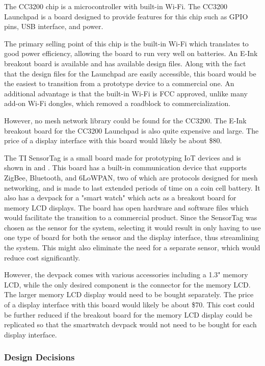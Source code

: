\documentclass[PPFS.tex]{template/subfiles}
\begin{document}
The CC3200 chip is a microcontroller with built-in Wi-Fi. The CC3200 Launchpad is a board designed to provide features for this chip such as GPIO pins, USB interface, and power.

The primary selling point of this chip is the built-in Wi-Fi which translates to good power efficiency, allowing the board to run very well on batteries. An E-Ink breakout board is available and has available design files. Along with the fact that the design files for the Launchpad are easily accessible, this board would be the easiest to transition from a prototype device to a commercial one. An additional advantage is that the built-in Wi-Fi is FCC approved, unlike many add-on Wi-Fi dongles, which removed a roadblock to commercialization.

However, no mesh network library could be found for the CC3200. The E-Ink breakout board for the CC3200 Launchpad is also quite expensive and large. The price of a display interface with this board would likely be about \$80.

The TI SensorTag is a small board made for prototyping IoT devices and is shown in  and . This board has a built-in communication device that supports ZigBee, Bluetooth, and 6LoWPAN, two of which are protocols designed for mesh networking, and is made to last extended periods of time on a coin cell battery. It also has a devpack for a "smart watch" which acts as a breakout board for memory LCD displays. The board has open hardware and software files which would facilitate the transition to a commercial product. Since the SensorTag was chosen as the sensor for the system, selecting it would result in only having to use one type of board for both the sensor and the display interface, thus streamlining the system. This might also eliminate the need for a separate sensor, which would reduce cost significantly.

However, the devpack comes with various accessories including a 1.3" memory LCD, while the only desired component is the connector for the memory LCD. The larger memory LCD display would need to be bought separately. The price of a display interface with this board would likely be about \$70. This cost could be further reduced if the breakout board for the memory LCD display could be replicated so that the smartwatch devpack would not need to be bought for each display interface.

\subsubsection{Design Decisions}
\end{document}
